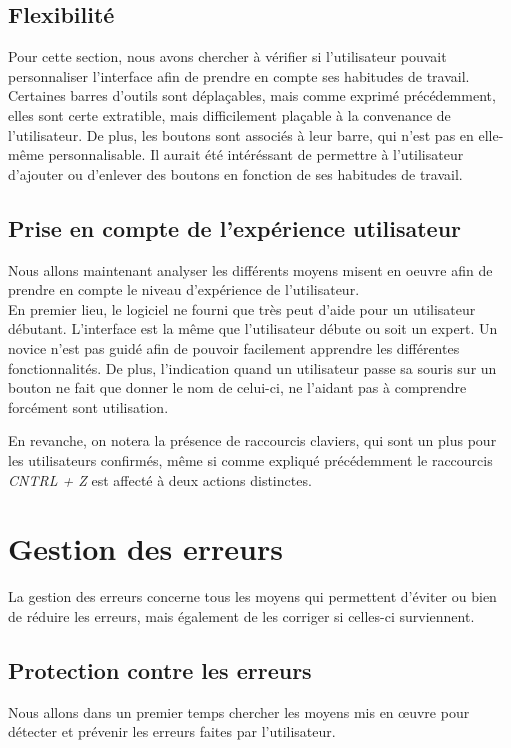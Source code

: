 \documentclass[12pt, a4paper]{article}
\begin{document}
\subsection{Flexibilité}
Pour cette section, nous avons chercher à vérifier si l'utilisateur pouvait personnaliser l'interface afin de prendre en compte ses habitudes de travail. \\


Certaines barres d'outils sont déplaçables, mais comme exprimé précédemment, elles sont certe extratible, mais difficilement plaçable à la convenance de l'utilisateur. De plus, les boutons sont associés à leur barre, qui n'est pas en elle-même personnalisable. Il aurait été intéréssant de permettre à l'utilisateur d'ajouter ou d'enlever des boutons en fonction de ses habitudes de travail.
\subsection{Prise en compte de l'expérience utilisateur}
Nous allons maintenant analyser les différents moyens misent en oeuvre afin de prendre en compte le niveau d'expérience de l'utilisateur.\\


En premier lieu, le logiciel ne fourni que très peut d'aide pour un utilisateur débutant. L'interface est la même que l'utilisateur débute ou soit un expert. Un novice n'est pas guidé afin de pouvoir facilement apprendre les différentes fonctionnalités. De plus, l'indication quand un utilisateur passe sa souris sur un bouton ne fait que donner le nom de celui-ci, ne l'aidant pas à comprendre forcément sont utilisation.


En revanche, on notera la présence de raccourcis claviers, qui sont un plus pour les utilisateurs confirmés, même si comme expliqué précédemment le raccourcis \emph{CNTRL + Z} est affecté à deux actions distinctes.

\section{Gestion des erreurs}
La gestion des erreurs concerne tous les moyens qui permettent d'éviter ou bien de réduire les erreurs, mais également de les corriger si celles-ci surviennent.

\subsection{Protection contre les erreurs}
Nous allons dans un premier temps chercher les moyens mis en œuvre pour détecter et prévenir les erreurs faites par l'utilisateur. \\
\end{document}
